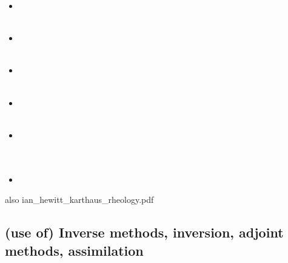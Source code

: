 \begin{scriptsize}
\begin{itemize}
\textcite{moad14} \cite{moad14}\\
\item[\twothousandfifteen] 
\textcite{issg15} \cite{issg15}\\
\textcite{frlg15} \cite{frlg15}\\
\item[\twothousandsixteen] 
\textcite{krab16} \cite{krab16}\\
\textcite{daws16} \cite{daws16}\\
\item[\twothousandseventeen] 
\textcite{lolc17} \cite{lolc17}\\
\textcite{gors17} \cite{gors17}\\
\item[\twothousandeighteen] 
\textcite{heah18} \cite{heah18}\\
\textcite{mimr18} \cite{mimr18}\\
\item[\twothousandnineteen] 
\textcite{kudd19} \cite{kudd19}\\
\textcite{kuwd19} \cite{kuwd19}\\
\textcite{kuiper19} \cite{kuiper19}\\
\item[\twothousandtwentyone] 
\textcite{begv21} \cite{begv21}\\
\end{itemize}
\end{scriptsize}


also ian\_hewitt\_karthaus\_rheology.pdf

\subsection{(use of) Inverse methods, inversion, adjoint methods, assimilation}


